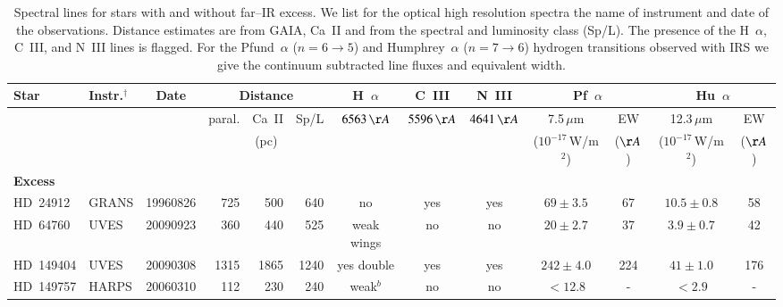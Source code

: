 \documentclass[tradiabstract]{aa} %
\begin{document}


\begin{table*} [h!tb]
\begin{center}
  \caption{Spectral lines for stars with and without far--IR
    excess. We list for the optical high resolution spectra the name
    of instrument and date of the observations. Distance estimates are
    from GAIA, Ca~II and from the spectral and luminosity class
    (Sp/L).  The presence of the H~$\alpha$, C~III, and N~III lines is
    flagged. { For the Pfund~$\alpha$ ($n=6 \rightarrow 5$) and
      Humphrey~$\alpha$ ($n=7 \rightarrow 6$) hydrogen transitions
      observed with IRS we give the continuum subtracted line fluxes
       and equivalent width}. \label{hrs.tab}} \small
  \begin{tabular}{l lc rrr ccc  cccc }
    \hline
      \hline
      Star      &Instr.$^{\dag}$        & Date   & \multicolumn{3}{c}{Distance} &H~$\alpha$ & C~III     & N~III 
      & \multicolumn{2}{c}{Pf~$\alpha$}   & \multicolumn{2}{c}{Hu~$\alpha$ }\\
      \hline
      &                    &        & paral. & Ca~II & Sp/L       &${6563\,\AA}$&${5596\,\AA}$&${4641\,\AA}$ &7.5\,$\mu$m & EW & 12.3\,$\mu$m          & EW \\
      &                    &        & \multicolumn{3}{c}{(pc)}      &           &           &             & ($10^{-17}$\,W/m$^2$)  & ($\AA$) & ($10^{-17}$\,W/m$^2$) & ($\AA$)    \\
      \hline
          {\bf Excess}    &        &          &    &    &           &                   &         &       & &  \\
HD~24912   &   \scriptsize{GRANS}     &  \scriptsize{19960826}  & 725& 500& 640      & \scriptsize{no}                 & \scriptsize{yes}     & \scriptsize{yes}   & \small{$69 \pm 3.5  $}& 67& \small{$10.5 \pm 0.8  $}& 58 \\
HD~64760   &   \scriptsize{UVES}     &  \scriptsize{20090923}  & 360& 440& 525      & \scriptsize{weak wings}         & \scriptsize{no}      & \scriptsize{no}     & \small{$20 \pm 2.7  $}& 37 & \small{$3.9 \pm 0.7  $}& 42 \\
HD~149404  &   \scriptsize{UVES}     &  \scriptsize{20090308}  & 1315& 1865& 1240    &  \scriptsize{yes double}       & \scriptsize{yes}     & \scriptsize{yes}   & \small{$242 \pm 4.0 $}& 224 & \small{$41 \pm 1.0  $}& 176 \\
HD~149757  &   \scriptsize{HARPS}     &  \scriptsize{20060310}  & 112& 230 & 240   &  \scriptsize{weak$^b$}       & \scriptsize{no} & \scriptsize{no}               & \small{$<12.8       $}& - & \small{$<2.9          $}& - \\  

\end{tabular}
\end{center}
\end{table*}
\end{document}
